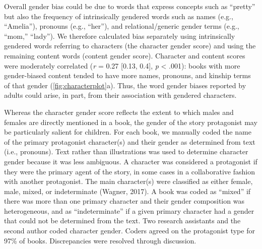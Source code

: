 \documentclass[
  english,
  ,man,floatsintext]{apa6}
\begin{document}
Overall gender bias could be due to words that express concepts such as ``pretty'' but also the frequency of intrinsically gendered words such as names (e.g., ``Amelia''), pronouns (e.g., ``her''), and relational/generic gender terms (e.g., ``mom,'' ``lady''). We therefore calculated bias separately using intrinsically gendered words referring to characters (the character gender score) and using the remaining content words (content gender score). Character and content scores were moderately correlated (\emph{r} = 0.27 {[}0.13, 0.4{]}, \emph{p} \textless{} .001): books with more gender-biased content tended to have more names, pronouns, and kinship terms of that gender (\autoref{fig:characterplot}a). Thus, the word gender biases reported by adults could arise, in part, from their association with gendered characters.

Whereas the character gender score reflects the extent to which males and females are directly mentioned in a book, the gender of the story protagonist may be particularly salient for children. For each book, we manually coded the name of the primary protagonist character(s) and their gender as determined from text (i.e., pronouns). Text rather than illustrations was used to determine character gender because it was less ambiguous. A character was considered a protagonist if they were the primary agent of the story, in some cases in a collaborative fashion with another protagonist. The main character(s) were classified as either female, male, mixed, or indeterminate (Wagner, 2017). A book was coded as ``mixed'' if there was more than one primary character and their gender composition was heterogeneous, and as ``indeterminate'' if a given primary character had a gender that could not be determined from the text. Two research assistants and the second author coded character gender. Coders agreed on the protagonist type for 97\% of books. Discrepancies were resolved through discussion.
\end{document}
